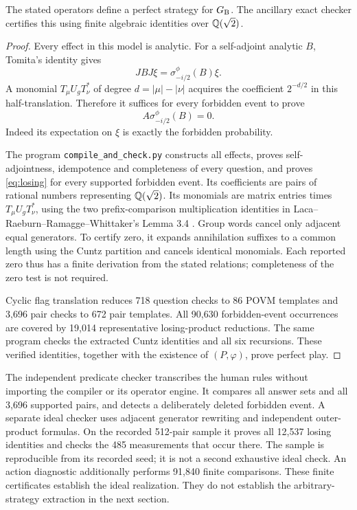 \begin{proposition}\label{prop:certificate}
The stated operators define a perfect strategy for $G_{\mathrm B}$. The ancillary exact checker certifies this using finite algebraic identities over $\mathbb Q(\sqrt2)$.
\end{proposition}
\begin{proof}
Every effect in this model is analytic. For a self-adjoint analytic $B$, Tomita's identity gives
\begin{equation}\label{eq:tomita}
 JBJ\xi=\sigma_{-i/2}^\phi(B)\xi.
\end{equation}
A monomial $T_\mu U_gT_\nu^*$ of degree $d=|\mu|-|\nu|$ acquires the coefficient $2^{-d/2}$ in this half-translation. Therefore it suffices for every forbidden event to prove
\begin{equation}\label{eq:losing}
 A\sigma_{-i/2}^\phi(B)=0.
\end{equation}
Indeed its expectation on $\xi$ is exactly the forbidden probability.

The program \texttt{compile\_and\_check.py} constructs all effects, proves self-adjointness, idempotence and completeness of every question, and proves \eqref{eq:losing} for every supported forbidden event. Its coefficients are pairs of rational numbers representing $\mathbb Q(\sqrt2)$. Its monomials are matrix entries times $T_\mu U_gT_\nu^*$, using the two prefix-comparison multiplication identities in Laca--Raeburn--Ramagge--Whittaker's Lemma 3.4 \cite{LRRW}. Group words cancel only adjacent equal generators. To certify zero, it expands annihilation suffixes to a common length using the Cuntz partition and cancels identical monomials. Each reported zero thus has a finite derivation from the stated relations; completeness of the zero test is not required.

Cyclic flag translation reduces 718 question checks to 86 POVM templates and 3,696 pair checks to 672 pair templates. All 90,630 forbidden-event occurrences are covered by 19,014 representative losing-product reductions. The same program checks the extracted Cuntz identities and all six recursions. These verified identities, together with the existence of $(P,\varphi)$, prove perfect play.
\end{proof}

The independent predicate checker transcribes the human rules without importing the compiler or its operator engine. It compares all answer sets and all 3,696 supported pairs, and detects a deliberately deleted forbidden event. A separate ideal checker uses adjacent generator rewriting and independent outer-product formulas. On the recorded 512-pair sample it proves all 12,537 losing identities and checks the 485 measurements that occur there. The sample is reproducible from its recorded seed; it is not a second exhaustive ideal check. An action diagnostic additionally performs 91,840 finite comparisons. These finite certificates establish the ideal realization. They do not establish the arbitrary-strategy extraction in the next section.

